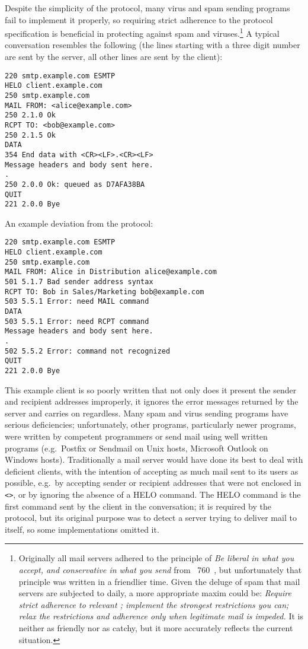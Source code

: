 \SMTPglossaryDescription{} Despite the simplicity of the protocol, many
virus and spam sending programs fail to implement it properly, so requiring
strict adherence to the protocol specification is beneficial in protecting
against spam and viruses.\footnote{Originally all mail servers adhered to
the principle of \textit{Be liberal in what you accept, and conservative in
what you send\/} from ~760~\cite{rfc760}, but unfortunately
that principle was written in a friendlier time.  Given the deluge of spam
that mail servers are subjected to daily, a more appropriate maxim could
be: \textit{Require strict adherence to relevant ; implement
the strongest restrictions you can; relax the restrictions and adherence
only when legitimate mail is impeded.\/}  It is neither as friendly nor as
catchy, but it more accurately reflects the current situation.} A typical
 conversation resembles the following (the lines starting
with a three digit number are sent by the server, all other lines are sent
by the client):

\begin{verbatim}
220 smtp.example.com ESMTP
HELO client.example.com
250 smtp.example.com
MAIL FROM: <alice@example.com>
250 2.1.0 Ok
RCPT TO: <bob@example.com>
250 2.1.5 Ok
DATA
354 End data with <CR><LF>.<CR><LF>
Message headers and body sent here.
.
250 2.0.0 Ok: queued as D7AFA38BA
QUIT
221 2.0.0 Bye
\end{verbatim}

An example deviation from the protocol:

\begin{verbatim}
220 smtp.example.com ESMTP
HELO client.example.com
250 smtp.example.com
MAIL FROM: Alice in Distribution alice@example.com
501 5.1.7 Bad sender address syntax
RCPT TO: Bob in Sales/Marketing bob@example.com
503 5.5.1 Error: need MAIL command
DATA
503 5.5.1 Error: need RCPT command
Message headers and body sent here.
.
502 5.5.2 Error: command not recognized
QUIT
221 2.0.0 Bye
\end{verbatim}

This example client is so poorly written that not only does it present the
sender and recipient addresses improperly, it ignores the error messages
returned by the server and carries on regardless.  Many spam and virus
sending programs have serious deficiencies; unfortunately, other programs,
particularly newer programs, were written by competent programmers or send
mail using well written programs (e.g.\ Postfix or Sendmail on Unix hosts,
Microsoft Outlook on Windows hosts).  Traditionally a mail server would
have done its best to deal with deficient clients, with the intention of
accepting as much mail sent to its users as possible, e.g.\ by accepting
sender or recipient addresses that were not enclosed in \texttt{<>}, or by
ignoring the absence of a HELO command.  The HELO command is the first
command sent by the client in the  conversation; it is
required by the protocol, but its original purpose was to detect a server
trying to deliver mail to itself, so some implementations omitted it.

